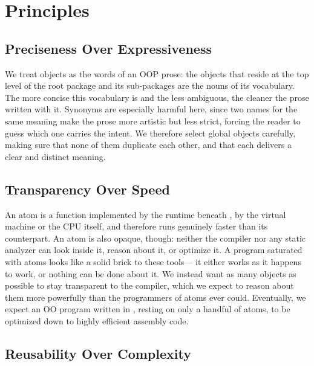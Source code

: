 
\section{Principles}

\subsection{Preciseness Over Expressiveness}

We treat objects as the words of an OOP prose:
  the objects that reside at the top level of the root package
  and its sub-packages are the nouns of its vocabulary.
The more concise this vocabulary is and the less ambiguous,
  the cleaner the prose written with it.
Synonyms are especially harmful here,
  since two names for the same meaning make the prose more artistic
  but less strict, forcing the reader to guess which one carries the intent.
We therefore select global objects carefully,
  making sure that none of them duplicate each other,
  and that each delivers a clear and distinct meaning.

\subsection{Transparency Over Speed}

An atom is a function implemented by the runtime beneath \eolang{},
  by the virtual machine or the CPU itself,
  and therefore runs genuinely faster than its \eolang{} counterpart.
An atom is also opaque, though:
  neither the \eolang{} compiler nor any static analyzer
  can look inside it, reason about it, or optimize it.
A program saturated with atoms looks like a solid brick to these tools---
  it either works as it happens to work,
  or nothing can be done about it.
We instead want as many objects as possible to stay transparent to the compiler,
  which we expect to reason about them more powerfully
  than the programmers of atoms ever could.
Eventually, we expect an OO program written in \eolang{},
  resting on only a handful of atoms,
  to be optimized down to highly efficient assembly code.

\subsection{Reusability Over Complexity}

